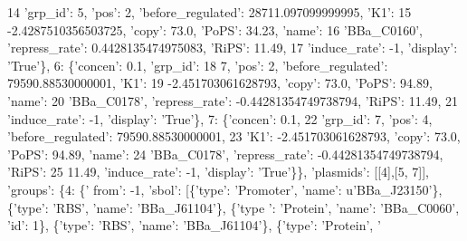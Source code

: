 \begin{DoxyCode}
14             \textcolor{stringliteral}{'grp\_id'}: 5, \textcolor{stringliteral}{'pos'}: 2, \textcolor{stringliteral}{'before\_regulated'}: 28711.097099999995, \textcolor{stringliteral}{'K1'}:
15             -2.4287510356503725, \textcolor{stringliteral}{'copy'}: 73.0, \textcolor{stringliteral}{'PoPS'}: 34.23, \textcolor{stringliteral}{'name'}:
16             \textcolor{stringliteral}{'BBa\_C0160'}, \textcolor{stringliteral}{'repress\_rate'}: 0.4428135474975083, \textcolor{stringliteral}{'RiPS'}: 11.49,
17             \textcolor{stringliteral}{'induce\_rate'}: -1, \textcolor{stringliteral}{'display'}: \textcolor{stringliteral}{'True'}\}, 6: \{\textcolor{stringliteral}{'concen'}: 0.1, \textcolor{stringliteral}{'grp\_id'}:
18               7, \textcolor{stringliteral}{'pos'}: 2, \textcolor{stringliteral}{'before\_regulated'}: 79590.88530000001, \textcolor{stringliteral}{'K1'}:
19               -2.451703061628793, \textcolor{stringliteral}{'copy'}: 73.0, \textcolor{stringliteral}{'PoPS'}: 94.89, \textcolor{stringliteral}{'name'}:
20               \textcolor{stringliteral}{'BBa\_C0178'}, \textcolor{stringliteral}{'repress\_rate'}: -0.44281354749738794, \textcolor{stringliteral}{'RiPS'}: 11.49,
21               \textcolor{stringliteral}{'induce\_rate'}: -1, \textcolor{stringliteral}{'display'}: \textcolor{stringliteral}{'True'}\}, 7: \{\textcolor{stringliteral}{'concen'}: 0.1,
22                 \textcolor{stringliteral}{'grp\_id'}: 7, \textcolor{stringliteral}{'pos'}: 4, \textcolor{stringliteral}{'before\_regulated'}: 79590.88530000001,
23                 \textcolor{stringliteral}{'K1'}: -2.451703061628793, \textcolor{stringliteral}{'copy'}: 73.0, \textcolor{stringliteral}{'PoPS'}: 94.89, \textcolor{stringliteral}{'name'}:
24                 \textcolor{stringliteral}{'BBa\_C0178'}, \textcolor{stringliteral}{'repress\_rate'}: -0.44281354749738794, \textcolor{stringliteral}{'RiPS'}:
25                 11.49, \textcolor{stringliteral}{'induce\_rate'}: -1, \textcolor{stringliteral}{'display'}: \textcolor{stringliteral}{'True'}\}\}, \textcolor{stringliteral}{'plasmids'}: [[4],[5, 7]], \textcolor{stringliteral}{'groups'}: \{4: \{\textcolor{stringliteral}{'
      from'}: -1, \textcolor{stringliteral}{'sbol'}: [\{\textcolor{stringliteral}{'type'}: \textcolor{stringliteral}{'Promoter'}, \textcolor{stringliteral}{'name'}: \textcolor{stringliteral}{u'BBa\_J23150'}\}, \{\textcolor{stringliteral}{'type'}: \textcolor{stringliteral}{'RBS'}, \textcolor{stringliteral}{'name'}: \textcolor{stringliteral}{'BBa\_J61104'}\}, \{\textcolor{stringliteral}{'type
      '}: \textcolor{stringliteral}{'Protein'}, \textcolor{stringliteral}{'name'}: \textcolor{stringliteral}{'BBa\_C0060'}, \textcolor{stringliteral}{'id'}: 1\}, \{\textcolor{stringliteral}{'type'}: \textcolor{stringliteral}{'RBS'}, \textcolor{stringliteral}{'name'}: \textcolor{stringliteral}{'BBa\_J61104'}\}, \{\textcolor{stringliteral}{'type'}: \textcolor{stringliteral}{'Protein'}, \textcolor{stringliteral}{'
}
\end{DoxyCode}

